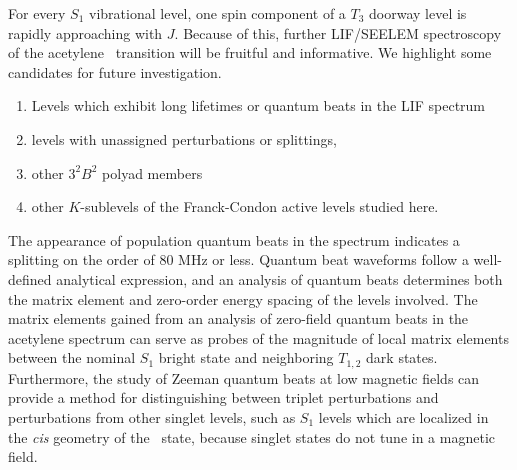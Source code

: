 For every $S_1$ vibrational level, one spin component of a $T_3$
doorway level is rapidly approaching with $J$.  Because of this,
further LIF/SEELEM spectroscopy of the acetylene \AtoX\ transition
will be fruitful and informative.  We highlight some candidates for
future investigation.
\begin{enumerate}
\item Levels which exhibit long lifetimes or quantum beats in the LIF
  spectrum
\item levels with unassigned perturbations or splittings,
\item other $3^2B^2$ polyad members
\item other $K$-sublevels of the Franck-Condon active levels studied
  here.  
\end{enumerate}

The appearance of population quantum beats in the spectrum indicates a
splitting on the order of 80 MHz or less.  Quantum beat waveforms
follow a well-defined analytical expression, and an analysis of
quantum beats determines both the matrix element and zero-order energy
spacing of the levels involved.  The matrix elements gained from an
analysis of zero-field quantum beats in the acetylene spectrum can
serve as probes of the magnitude of local matrix elements between the
nominal $S_1$ bright state and neighboring $T_{1,2}$ dark states.
Furthermore, the study of Zeeman quantum beats at low magnetic fields
can provide a method for distinguishing between triplet perturbations
and perturbations from other singlet levels, such as $S_1$ levels
which are localized in the \emph{cis} geometry of the \astate\ state,
because singlet states do not tune in a magnetic field.

%  
% 
% 
